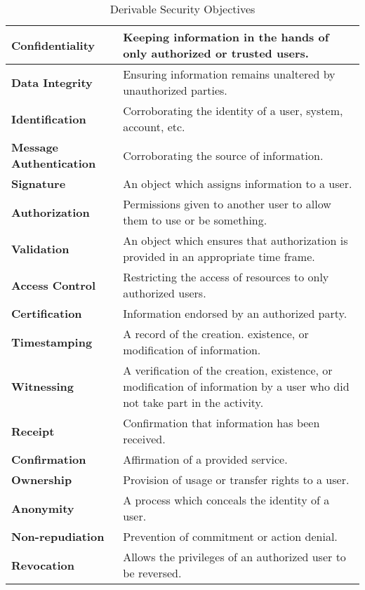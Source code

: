 \begin{table}
    \begin{center}
        \begin{tabularx}{350pt}{|X|X|} \hline \hline
            \bf{Confidentiality} & Keeping information in the hands of only authorized or trusted users. \\ \hline
            \bf{Data Integrity} & Ensuring information remains unaltered by unauthorized parties. \\ \hline
            \bf{Identification} & Corroborating the identity of a user, system, account, etc. \\ \hline
            \bf{Message Authentication} & Corroborating the source of information. \\ \hline
            \bf{Signature} & An object which assigns information to a user. \\ \hline
            \bf{Authorization} & Permissions given to another user to allow them to use or be something. \\ \hline
            \bf{Validation} & An object which ensures that authorization is provided in an appropriate time frame. \\ \hline
            \bf{Access Control} & Restricting the access of resources to only authorized users.\\ \hline
            \bf{Certification} & Information endorsed by an authorized party. \\ \hline
            \bf{Timestamping} & A record of the creation. existence, or modification of information. \\ \hline
            \bf{Witnessing} & A verification of the creation, existence, or modification of information by a user who did not take part in the activity. \\ \hline
            \bf{Receipt} & Confirmation that information has been received. \\ \hline
            \bf{Confirmation} & Affirmation of a provided service. \\ \hline
            \bf{Ownership} & Provision of usage or transfer rights to a user. \\ \hline
            \bf{Anonymity} & A process which conceals the identity of a user. \\ \hline
            \bf{Non-repudiation} & Prevention of commitment or action denial. \\ \hline
            \bf{Revocation} & Allows the privileges of an authorized user to be reversed. \\ \hline
        \end{tabularx} 
        \label{tb:dersecobj}
        \caption{Derivable Security Objectives}
    \end{center}
\end{table}